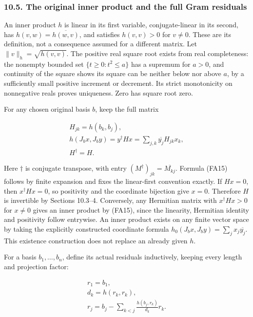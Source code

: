 \documentclass[
  11pt,
]{article}
\begin{document}
\subsubsection{10.5. The original inner product and the full Gram
residuals}\label{the-original-inner-product-and-the-full-gram-residuals}

An inner product \(h\) is linear in its first variable, conjugate-linear
in its second, has \(h(v,w)=\overline{h(w,v)}\), and satisfies
\(h(v,v)>0\) for \(v\ne0\). These are its definition, not a consequence
assumed for a different matrix. Let \(\|v\|_h=\sqrt{h(v,v)}\). The
positive real square root exists from real completeness: the nonempty
bounded set \(\{t\ge0:t^2\le a\}\) has a supremum for \(a>0\), and
continuity of the square shows its square can be neither below nor above
\(a\), by a sufficiently small positive increment or decrement. Its
strict monotonicity on nonnegative reals proves uniqueness. Zero has
square root zero.

For any chosen original basis \(b\), keep the full matrix

\[
\begin{gathered}
H_{jk}=h(b_k,b_j), \\ 
h(J_bx,J_by)=y^\dagger Hx
 =\sum_{j,k}\overline{y_j}H_{jk}x_k, \\ H^\dagger=H.
\end{gathered}
\tag{FA15}
\]

Here \(\dagger\) is conjugate transpose, with entry
\((M^\dagger)_{jk}=\overline{M_{kj}}\). Formula (FA15) follows by finite
expansion and fixes the linear-first convention exactly. If \(Hx=0\),
then \(x^\dagger Hx=0\), so positivity and the coordinate bijection give
\(x=0\). Therefore \(H\) is invertible by Sections 10.3--4. Conversely,
any Hermitian matrix with \(x^\dagger Hx>0\) for \(x\ne0\) gives an
inner product by (FA15), since the linearity, Hermitian identity and
positivity follow entrywise. An inner product exists on any finite
vector space by taking the explicitly constructed coordinate formula
\(h_0(J_bx,J_by)=\sum_j x_j\overline{y_j}\). This existence construction
does not replace an already given \(h\).

For a basis \(b_1,\ldots,b_n\), define its actual residuals inductively,
keeping every length and projection factor:

\[
\begin{gathered}
r_1=b_1, \\  d_k=h(r_k,r_k), \\ r_j=b_j-\sum_{k<j}\frac{h(b_j,r_k)}{d_k}r_k.
\end{gathered}
\tag{FA16}
\]
\end{document}
